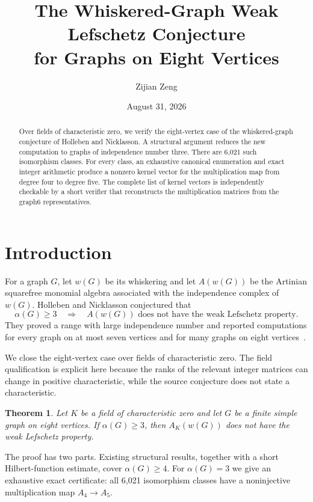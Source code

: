 \documentclass[11pt]{amsart}
\title[Eight-Vertex Whiskered-Graph WLP]{The Whiskered-Graph Weak Lefschetz Conjecture\\for Graphs on Eight Vertices}
\author{Zijian Zeng}
\date{August 31, 2026}
\newtheorem{theorem}{Theorem}[section]
\begin{document}
\begin{abstract}
Over fields of characteristic zero, we verify the eight-vertex case of the
whiskered-graph conjecture of Holleben and Nicklasson. A structural argument reduces
the new computation to graphs of independence number three. There are
6,021 such isomorphism classes. For every class, an exhaustive canonical
enumeration and exact integer arithmetic produce a nonzero kernel vector for
the multiplication map from degree four to degree five. The complete list of
kernel vectors is independently checkable by a short verifier that reconstructs
the multiplication matrices from the graph6 representatives.
\end{abstract}
\maketitle
\section{Introduction}
For a graph $G$, let $w(G)$ be its whiskering and let $A(w(G))$ be the
Artinian squarefree monomial algebra associated with the independence complex
of $w(G)$. Holleben and Nicklasson conjectured that
\[
  \alpha(G)\geq3\quad\Longrightarrow\quad A(w(G))\text{ does not have the
  weak Lefschetz property}.
\]
They proved a range with large independence number and reported computations
for every graph on at most seven vertices and for many graphs on eight
vertices~\cite[Corollary~3.12, Conjecture~3.15, Remark~3.16]{Holleben_2026}.

We close the eight-vertex case over fields of characteristic zero. The field
qualification is explicit here because the ranks of the relevant integer
matrices can change in positive characteristic, while the source conjecture
does not state a characteristic.

\begin{theorem}\label{thm:main}
Let $K$ be a field of characteristic zero and let $G$ be a finite simple graph
on eight vertices. If $\alpha(G)\geq3$, then $A_K(w(G))$ does not have the
weak Lefschetz property.
\end{theorem}

The proof has two parts. Existing structural results, together with a short
Hilbert-function estimate, cover $\alpha(G)\geq4$. For $\alpha(G)=3$ we give
an exhaustive exact certificate: all 6,021 isomorphism classes have a
noninjective multiplication map $A_4\to A_5$.
\end{document}
